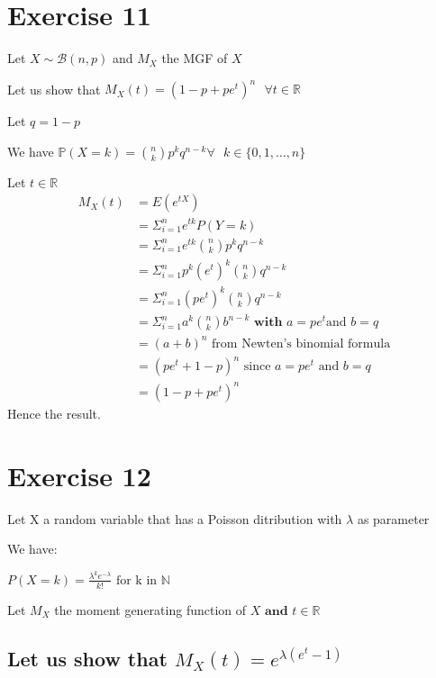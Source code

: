 \documentclass[11pt]{article}
\begin{document}
 
\newpage 
    \section{Exercise 11}
   Let $X  \sim \mathcal B(n,p)$ and $M_X$ the MGF of $X$
   
   Let us show that $M_X(t)=(1-p+pe^t)^n \text{ } \forall t \in \mathbb{R}$
   
   
   
   
Let $q=1-p$

We have $\mathbb{P}(X=k)=\binom{n}{k}p^k q^{n-k} \forall \text{ } k \in \{0, 1, \ldots, n\} $

Let $t \in \mathbb{R}$
  \begin{align*}
M_X(t) &=E(e^{tX})\\ 
	  &=\Sigma_{i=1}^{n}{ e^{tk} P(Y=k)}\\   
	   &=\Sigma_{i=1}^{n}{ e^{tk} \binom{n}{k}p^k q^{n-k}}\\
	   &=\Sigma_{i=1}^{n}{ p^k (e^{t})^k \binom{n}{k}q^{n-k}}\\
	   &=\Sigma_{i=1}^{n}{(pe^{t})^k \binom{n}{k}q^{n-k}}\\
	   &=\Sigma_{i=1}^{n}{a^k \binom{n}{k}b^{n-k}} \textbf{ with } a =pe^t \text{and }  b=q\\	
	   &=(a+b)^n \text{ from Newten's binomial formula}\\
	   &=(pe^t+1-p)^n \text{ since } a =pe^t \text{ and }  b=q\\
	   &=(1-p+pe^t)^n	  	  
\end{align*}
Hence the result.
   

\newpage 
    \section{Exercise 12}
    
   
   Let X a random variable that has a Poisson ditribution with $\lambda$ as parameter
   
   We have:
   
    $P(X=k)=\frac{\lambda^{k} e^{-\lambda}}{k! } \text{ for k in } \mathbb{N}$
   
   
   Let $M_X$ the moment generating function of $X \textbf{ and }  t \in \mathbb{R}$
  
  \subsection{Let us show that $M_X(t)=e^{\lambda(e^t-1)}$} 
   
\end{document}
